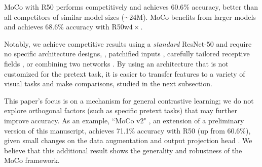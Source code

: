 \documentclass[10pt,twocolumn,letterpaper]{article}
\newcommand{\app}{\raise.17ex\hbox{$\scriptstyle\sim$}}
\newcommand{\tablestyle}[2]{\setlength{\tabcolsep}{#1}\renewcommand{\arraystretch}{#2}\centering\footnotesize}
\def\x{\times}
\begin{document}
MoCo with R50 performs competitively and achieves 60.6\% accuracy, better than all competitors of similar model sizes ($\app$24M).
MoCo benefits from larger models and achieves 68.6\% accuracy with R50w${4}{\x}$.

Notably, we achieve competitive results using a \emph{standard} ResNet-50 and require no specific architecture designs, \eg, patchified inputs \cite{Oord2018,Henaff2019}, carefully tailored receptive fields \cite{Bachman2019}, or combining two networks \cite{Tian2019}. By using an architecture that is not customized for the pretext task, it is easier to transfer features to a variety of visual tasks and make comparisons, studied in the next subsection.

This paper's focus is on a mechanism for general contrastive learning; we do not explore orthogonal factors (such as specific pretext tasks) that may further improve accuracy. As an example, ``MoCo v2" \cite{Chen2020a}, an extension of a preliminary version of this manuscript, achieves 71.1\% accuracy with R50 (up from 60.6\%), given small changes on the data augmentation and output projection head \cite{Chen2020}. We believe that this additional result shows the generality and robustness of the MoCo framework.



\newcommand{\randinit}{\tablestyle{1pt}{1} \begin{tabular}{z{21}y{26}} \multicolumn{2}{c}{\demph{random init.}} \end{tabular}}
\newcommand{\mocoimgnet}{\tablestyle{0pt}{1} \begin{tabular}{z{21}y{26}} \textbf{MoCo} & ~~IN-1M \end{tabular}}
\newcommand{\mocoins}{\tablestyle{0pt}{1} \begin{tabular}{z{21}y{26}} \textbf{MoCo} & ~~IG-1B \end{tabular}}
\newcommand{\supimgnet}{\tablestyle{0pt}{1} \begin{tabular}{z{21}y{26}} super. & ~~IN-1M \end{tabular}}

\newcommand{\demph}[1]{\textcolor{Gray}{#1}}
\newcommand{\std}[1]{{\fontsize{5pt}{1em}\selectfont ~~$_\pm$$_{\text{#1}}$}}

\end{document}
